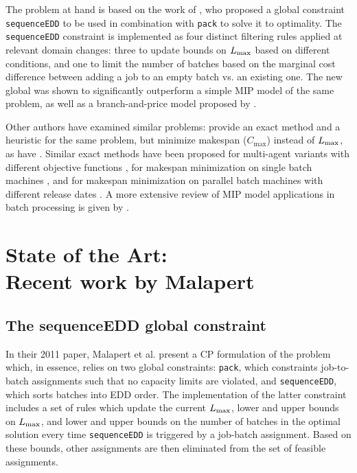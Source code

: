 \documentclass[13pt, letterpaper, oneside]{book}
\begin{document}
The problem at hand is based on the work of \citet{Malapert}, who proposed a global
constraint \texttt{sequenceEDD} to be used in combination with \texttt{pack} to
solve it to optimality. The \texttt{sequenceEDD} constraint is implemented as
four distinct filtering rules applied at relevant domain changes: three to update
bounds on $L_{\text{max}}$ based on different conditions, and one to limit the number of
batches based on the marginal cost difference between adding a job to an empty
batch vs. an existing one. The new global was shown to significantly outperform
a simple MIP model of the same problem, as well as a branch-and-price model
proposed by \citet{Daste1}.

Other authors have examined similar problems: \citet{Azizoglu} provide an exact
method and a heuristic for the same problem, but minimize makespan
($C_\text{max}$) instead of $L_{\text{max}}$, as have \citet{Dupont}. Similar exact
methods have been proposed for multi-agent variants with different objective
functions \citep{Sabouni}, for makespan minimization on single batch machines
\citep{Kashan}, and for makespan minimization on parallel batch machines with
different release dates \citep{Ozturk}. A more extensive review of MIP model
applications in batch processing is given by \citet{Grossmann}.


\chapter[State of the Art: Recent work by Malapert]{State of the Art:\\ Recent work by Malapert}
\label{sec:malapertcp}
\section{The sequenceEDD global constraint}
In their 2011 paper, Malapert et al. present a CP formulation of the problem
which, in essence, relies on two global constraints: \texttt{pack}, which
constraints job-to-batch assignments such that no capacity limits are violated,
and \texttt{sequenceEDD}, which sorts batches into EDD order. The implementation
of the latter constraint includes a set of rules which update the current
$L_{\text{max}}$, lower and upper bounds on $L_{\text{max}}$, and lower and upper bounds on the
number of batches in the optimal solution every time \texttt{sequenceEDD} is
triggered by a job-batch assignment. Based on these bounds, other assignments
are then eliminated from the set of feasible assignments.
\end{document}
